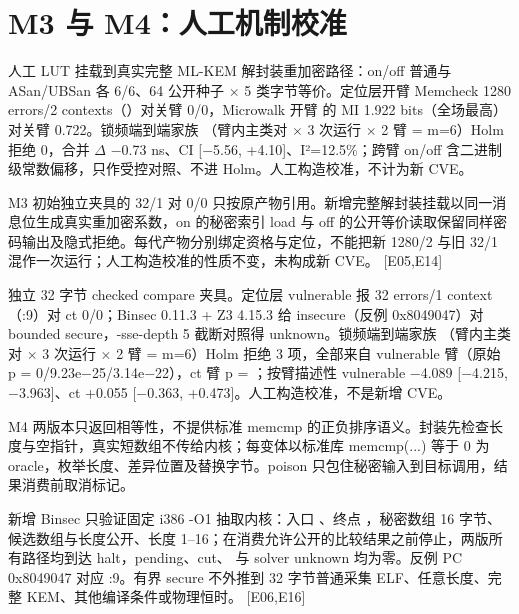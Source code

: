\documentclass[UTF8,fontset=fandol,11pt,a4paper]{ctexart}
\begin{document}
\section{M3 与 M4：人工机制校准}
人工 LUT 挂载到真实完整 ML-KEM 解封装重加密路径：on/off 普通与 ASan/UBSan 各 6/6、64 公开种子 \texorpdfstring{$\times$}{x} 5 类字节等价。定位层开臂 Memcheck 1280 errors/2 contexts（\texttt{}）对关臂 0/0，Microwalk 开臂 \texttt{} 的 MI 1.922 bits（全场最高）对关臂 0.722。锁频端到端家族 \texttt{}（臂内主类对 \texorpdfstring{$\times$}{x} 3 次运行 \texorpdfstring{$\times$}{x} 2 臂 = m=6）Holm 拒绝 0，合并 \texorpdfstring{$\Delta$}{Delta} \texorpdfstring{$-$}{-}0.73 ns、CI [\texorpdfstring{$-$}{-}5.56, +4.10]、I²=12.5\%；跨臂 on/off 含二进制级常数偏移，只作受控对照、不进 Holm。人工构造校准，不计为新 CVE。


M3 初始独立夹具的 32/1 对 0/0 只按原产物引用。新增完整解封装挂载以同一消息位生成真实重加密系数，on 的秘密索引 load 与 off 的公开等价读取保留同样密码输出及隐式拒绝。每代产物分别绑定资格与定位，不能把新 1280/2 与旧 32/1 混作一次运行；人工构造校准的性质不变，未构成新 CVE。 [E05,E14]


独立 32 字节 checked compare 夹具。定位层 vulnerable 报 32 errors/1 context（\texttt{}:9）对 ct 0/0；Binsec 0.11.3 + Z3 4.15.3 给 insecure（反例 0x8049047）对 bounded secure，-sse-depth 5 截断对照得 unknown。锁频端到端家族 \texttt{}（臂内主类对 \texorpdfstring{$\times$}{x} 3 次运行 \texorpdfstring{$\times$}{x} 2 臂 = m=6）Holm 拒绝 3 项，全部来自 vulnerable 臂（原始 p = 0/9.23e\texorpdfstring{$-$}{-}25/3.14e\texorpdfstring{$-$}{-}22），ct 臂 p = \texttt{}；按臂描述性 vulnerable \texorpdfstring{$-$}{-}4.089 [\texorpdfstring{$-$}{-}4.215, \texorpdfstring{$-$}{-}3.963]、ct +0.055 [\texorpdfstring{$-$}{-}0.363, +0.473]。人工构造校准，不是新增 CVE。


M4 两版本只返回相等性，不提供标准 memcmp 的正负排序语义。封装先检查长度与空指针，真实短数组不传给内核；每变体以标准库 memcmp(...) 等于 0 为 oracle，枚举长度、差异位置及替换字节。poison 只包住秘密输入到目标调用，结果消费前取消标记。


新增 Binsec 只验证固定 i386 -O1 抽取内核：入口 \texttt{}、终点 \texttt{}，秘密数组 16 字节、候选数组与长度公开、长度 1–16；在消费允许公开的比较结果之前停止，两版所有路径均到达 halt，pending、cut、\texttt{} 与 solver unknown 均为零。反例 PC 0x8049047 对应 \texttt{}:9。有界 secure 不外推到 32 字节普通采集 ELF、任意长度、完整 KEM、其他编译条件或物理恒时。 [E06,E16]
\end{document}
